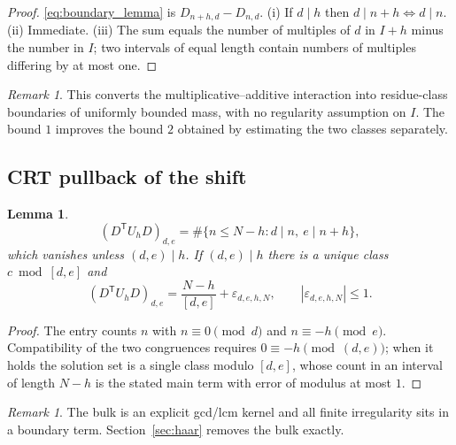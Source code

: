 \documentclass[11pt]{amsart}
\numberwithin{equation}{section}
\theoremstyle{plain}
\newtheorem{lemma}[theorem]{Lemma}
\theoremstyle{definition}
\theoremstyle{remark}
\newtheorem{remark}[theorem]{Remark}
\begin{document}
\begin{proof}
\eqref{eq:boundary_lemma} is $D_{n+h,d}-D_{n,d}$. (i) If $d\mid h$ then
$d\mid n+h\iff d\mid n$. (ii) Immediate. (iii) The sum equals the number
of multiples of $d$ in $I+h$ minus the number in $I$; two intervals of
equal length contain numbers of multiples differing by at most one.
\end{proof}

\begin{remark}
\label{rem:boundary_interpretation}
This converts the multiplicative--additive interaction into residue-class
boundaries of uniformly bounded mass, with no regularity assumption on
$I$. The bound $1$ improves the bound $2$ obtained by estimating the two
classes separately.
\end{remark}

\subsection{CRT pullback of the shift}
\label{subsec:crt_pullback}

\begin{lemma}
\label{lem:crt_pullback}
\begin{equation}
(D^{\mathsf T}U_hD)_{d,e}=\#\{n\le N-h: d\mid n,\ e\mid n+h\},
\label{eq:crt_pullback_definition}
\end{equation}
which vanishes unless $(d,e)\mid h$. If $(d,e)\mid h$ there is a unique
class $c\bmod[d,e]$ and
\begin{equation}
(D^{\mathsf T}U_hD)_{d,e}=\frac{N-h}{[d,e]}+\varepsilon_{d,e,h,N},
\qquad |\varepsilon_{d,e,h,N}|\le1 .
\label{eq:crt_pullback}
\end{equation}
\end{lemma}

\begin{proof}
The entry counts $n$ with $n\equiv0\pmod d$ and $n\equiv-h\pmod e$.
Compatibility of the two congruences requires
$0\equiv-h\pmod{(d,e)}$; when it holds the solution set is a single
class modulo $[d,e]$, whose count in an interval of length $N-h$ is the
stated main term with error of modulus at most $1$.
\end{proof}

\begin{remark}
\label{rem:bulk_and_boundary}
The bulk is an explicit gcd/lcm kernel and all finite irregularity sits
in a boundary term. Section~\ref{sec:haar} removes the bulk exactly.
\end{remark}
\end{document}
